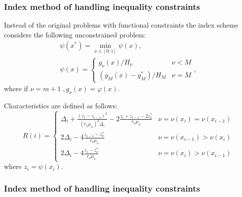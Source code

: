 \documentclass[aspectratio=1610]{beamer}
\begin{document}
\begin{frame}
  \frametitle{Index method of handling inequality constraints}
  Instead of the original problems with functional constraints the index scheme considers the following unconstrained problem:
  \begin{displaymath}
    \begin{array}{lr}
      \psi (x^{*})=\min_{x\in [0;1]}\psi (x), \\
      \psi (x)={\begin{cases}g_{\nu }(x)/H_{\nu }&\nu <M\\(g_{M}(x)-g_{M}^{*})/H_{M}&\nu =M\end{cases}},
    \end{array}
  \end{displaymath}
  where if \(\nu=m+1\;,g_\nu(x)=\varphi(x)\).

  Characteristics are defined as follows:
  \begin{displaymath}
    R(i)={\begin{cases}\Delta _{i}+{\frac {(z_{i}-z_{i-1})^{2}}{(r_{\nu }\mu _{\nu })^{2}\Delta _{i}}}-2{\frac {z_{i}+z_{i-1}-2z_{\nu }^{*}}{r_{\nu }\mu _{\nu }}}&\nu =\nu (x_{i})=\nu (x_{i-1})\\2\Delta _{i}-4{\frac {z_{i-1}-z_{\nu }^{*}}{r_{\nu }\mu _{\nu }}}&\nu =\nu (x_{i-1})>\nu (x_{i})\\2\Delta _{i}-4{\frac {z_{i}-z_{\nu }^{*}}{r_{\nu }\mu _{\nu }}}&\nu =\nu (x_{i})>\nu (x_{i-1})\end{cases}}
  \end{displaymath}
  where \(z_i=\psi(x_i)\).
\end{frame}

\begin{frame}
  \frametitle{Index method of handling inequality constraints}
\end{frame}
\end{document}
